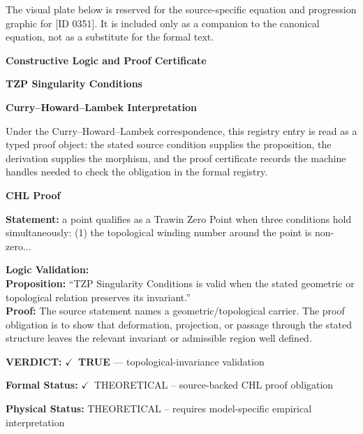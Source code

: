 \begingroup\footnotesize\sloppy
The visual plate below is reserved for the source-specific equation and progression graphic for [ID 0351]. It is included only as a companion to the canonical equation, not as a substitute for the formal text.
\par\endgroup
\ifTZPDarkEdition
{}
\fi

\clearpage
\begingroup\tzpsupportsetup
\noindent\textbf{\fontsize{10.8pt}{12.8pt}\selectfont [ID 0351] Constructive Logic and Proof Certificate}\par
\noindent\textbf{\fontsize{10pt}{12pt}\selectfont TZP Singularity Conditions}\par
\vspace{0.45em}
\begingroup
\footnotesize
\setlength{\parskip}{0.22em}
\setlength{\parindent}{0pt}
\noindent\textbf{Curry--Howard--Lambek Interpretation}\par
Under the Curry--Howard--Lambek correspondence, this registry entry is read as a typed proof
object: the stated source condition supplies the proposition, the derivation supplies the
morphism, and the proof certificate records the machine handles needed to check the obligation
in the formal registry.

\vspace{0.45em}
\noindent\textbf{CHL Proof}\par
\textbf{Statement:} a point qualifies as a Trawin Zero Point when three conditions hold simultaneously: (1)
the topological winding number around the point is non-zero...

\textbf{Logic Validation:}\\
\textbf{Proposition:} ``TZP Singularity Conditions is valid when the stated geometric or topological relation
preserves its invariant.''\\
\textbf{Proof:} The source statement names a geometric/topological carrier. The proof obligation is to
show that deformation, projection, or passage through the stated structure leaves the
relevant invariant or admissible region well defined.

\textbf{VERDICT:} \ensuremath{\checkmark}\ \textbf{TRUE} --- topological-invariance validation

\textbf{Formal Status:} \ensuremath{\checkmark}\ THEORETICAL -- source-backed CHL proof obligation

\textbf{Physical Status:} THEORETICAL -- requires model-specific empirical interpretation
\par\vspace{0.45em}
\par
\ifTZPDarkEdition
{}
\fi
\endgroup
\endgroup
